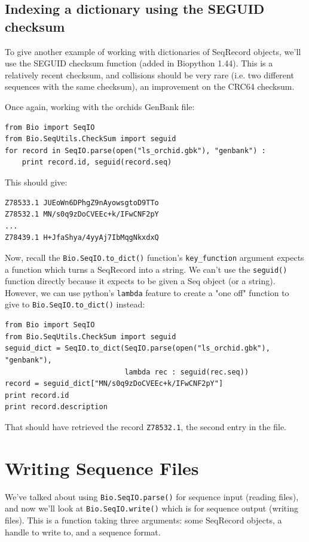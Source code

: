 \documentclass{report}
\begin{document}
\subsection{Indexing a dictionary using the SEGUID checksum}

To give another example of working with dictionaries of SeqRecord objects, we'll use the SEGUID checksum function (added in Biopython 1.44).  This is a relatively recent checksum, and collisions should be very rare (i.e. two different sequences with the same checksum), an improvement on the CRC64 checksum.

Once again, working with the orchids GenBank file:

\begin{verbatim}
from Bio import SeqIO
from Bio.SeqUtils.CheckSum import seguid
for record in SeqIO.parse(open("ls_orchid.gbk"), "genbank") :
    print record.id, seguid(record.seq)
\end{verbatim}

\noindent This should give:

\begin{verbatim}
Z78533.1 JUEoWn6DPhgZ9nAyowsgtoD9TTo
Z78532.1 MN/s0q9zDoCVEEc+k/IFwCNF2pY
...
Z78439.1 H+JfaShya/4yyAj7IbMqgNkxdxQ
\end{verbatim}

Now, recall the \verb|Bio.SeqIO.to_dict()| function's \verb|key_function| argument expects a function which turns a SeqRecord into a string.  We can't use the \verb|seguid()| function directly because it expects to be given a Seq object (or a string).  However, we can use python's \verb|lambda| feature to create a "one off" function to give to \verb|Bio.SeqIO.to_dict()| instead:

\begin{verbatim}
from Bio import SeqIO
from Bio.SeqUtils.CheckSum import seguid
seguid_dict = SeqIO.to_dict(SeqIO.parse(open("ls_orchid.gbk"), "genbank"),
                            lambda rec : seguid(rec.seq))
record = seguid_dict["MN/s0q9zDoCVEEc+k/IFwCNF2pY"]
print record.id
print record.description
\end{verbatim}

\noindent That should have retrieved the record {\tt Z78532.1}, the second entry in the file.

\section{Writing Sequence Files}

We've talked about using \verb|Bio.SeqIO.parse()| for sequence input (reading files), and now we'll look at \verb|Bio.SeqIO.write()| which is for sequence output (writing files).  This is a function taking three arguments: some SeqRecord objects, a handle to write to, and a sequence format.
\end{document}
